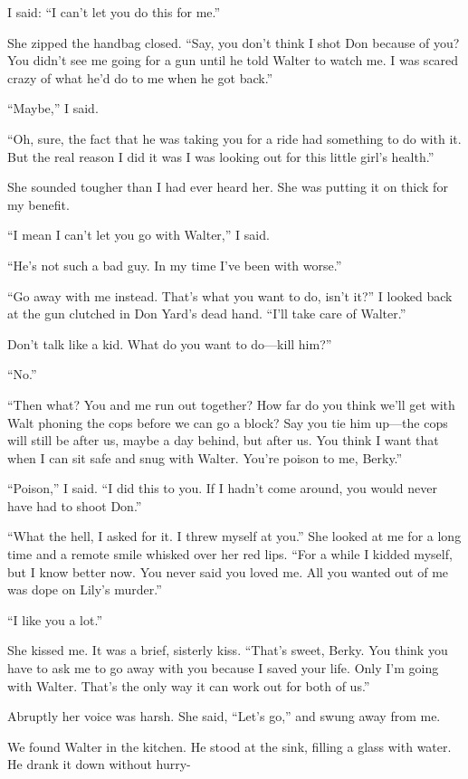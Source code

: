 \documentclass{novel}
\begin{document}
{I said: “I can’t let you do this for me.”

She zipped the handbag closed. “Say, you don’t think I shot Don because of you? You didn’t see me going for a gun until he told Walter to watch me. I was scared crazy of what he’d do to me when he got back.”

“Maybe,” I said.

“Oh, sure, the fact that he was taking you for a ride had something to do with it. But the real reason I did it was I was looking out for this little girl’s health.”

She sounded tougher than I had ever heard her. She was putting it on thick for my benefit.

“I mean I can’t let you go with Walter,” I said.

“He’s not such a bad guy. In my time I’ve been with worse.”

“Go away with me instead. That’s what you want to do, isn’t it?” I looked back at the gun clutched in Don Yard’s dead hand. “I’ll take care of Walter.”

Don’t talk like a kid. What do you want to do—kill him?”

“No.”

“Then what? You and me run out together? How far do you think we’ll get with Walt phoning the cops before we can go a block? Say you tie him up—the cops will still be after us, maybe a day behind, but after us. You think I want that when I can sit safe and snug with Walter. You’re poison to me, Berky.”

“Poison,” I said. “I did this to you. If I hadn’t come around, you would never have had to shoot Don.”

“What the hell, I asked for it. I threw myself at you.” She looked at me for a long time and a remote smile whisked over her red lips. “For a while I kidded myself, but I know better now. You never said you loved me. All you wanted out of me was dope on Lily’s murder.”

“I like you a lot.”

She kissed me. It was a brief, sisterly kiss. “That’s sweet, Berky. You think you have to ask me to go away with you because I saved your life. Only I’m going with Walter. That’s the only way it can work out for both of us.”

Abruptly her voice was harsh. She said, “Let’s go,” and swung away from me.

We found Walter in the kitchen. He stood at the sink, filling a glass with water. He drank it down without hurry-

}
\end{document}
